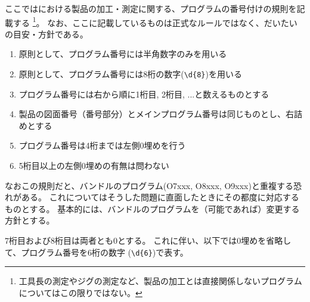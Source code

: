 

ここでは\DMname における製品の加工・測定に関する、プログラムの番号付けの規則を記載する
\footnote{工具長の測定やジグの測定など、製品の加工とは直接関係しないプログラムについてはこの限りではない。}。
なお、ここに記載しているものは正式なルールではなく、だいたいの目安・方針である。
\begin{enumerate}[label=\Roman*., ref=\Roman*)]
\item 原則として、プログラム番号には半角数字のみを用いる
\item 原則として、プログラム番号には8桁の数字(\verb|\d{8}|)を用いる
\item プログラム番号には右から順に1桁目, 2桁目, ...と数えるものとする
\item 製品の図面番号（番号部分）とメインプログラム番号は同じものとし、右詰めとする
\item プログラム番号は4桁までは左側0埋めを行う
\item 5桁目以上の左側0埋めの有無は問わない
\end{enumerate}
なおこの規則だと、バンドルのプログラム(O7xxx, O8xxx, O9xxx)と重複する恐れがある。
これについてはそうした問題に直面したときにその都度に対応するものとする。
基本的には、バンドルのプログラムを（可能であれば）変更する方針とする。



7桁目および8桁目は両者とも0とする。
これに伴い、以下では0埋めを省略して、プログラム番号を6桁の数字 (\verb|\d{6}|)で表す。


